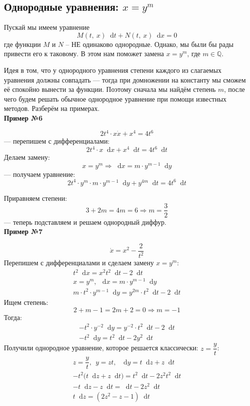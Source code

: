 \documentclass[a4paper,12pt]{article}
\newcommand{\Q}{\mathbb{Q}}
\renewcommand*\d{\mathop{}\!\mathrm{d}}
\newcommand{\dx}{\dot{x}}
\begin{document}
\subsection{Однородные уравнения: $x = y^m$}

Пускай мы имеем уравнение
\[M(t,\ x) \d t + N(t,\ x)\d x = 0\] где функции $M$ и $N$ -- НЕ одинаково однородные. Однако, мы были бы рады привести его к таковому. В этом нам поможет замена $x = y^m$, где $m \in \Q$. 

Идея в том, что у однородного уравнения степени каждого из слагаемых уравнения должны совпадать --- тогда при домножении на константу мы сможем её спокойно вынести за функции. Поэтому сначала мы найдём степень $m$, после чего будем решать обычное однородное уравнение при помощи известных методов. Разберём на примерах.
\ \\

\textbf{Пример №6}

\[2t^4\cdot x\dx + x^4 = 4t^6\] --- перепишем с дифференциалами:
\[2t^4 \cdot x\d x + x^4\d t= 4t^6\d t\]
Делаем замену:
\[x = y^m \Longrightarrow \d x = m \cdot y^{m - 1}\d y\] --- получаем уравнение:
\[2t^4 \cdot y^m \cdot m \cdot y^{m - 1}\d y + y^{4m}\d t = 4t^6\d t\]

Приравняем степени:
\[3 + 2m = 4m = 6 \Longrightarrow m = \dfrac{3}{2}\] --- теперь подставляем и решаем однородный диффур.
\ \\

\textbf{Пример №7}

\[\dx = x^2 - \dfrac{2}{t^2}\]
Перепишем с дифференциалами и сделаем замену $x = y^m$:
\begin{gather*}
	t^2\d x = x^2t^2\d t - 2\d t\\
	x = y^m,\ \d x =  m \cdot y^{m - 1}\d y\\
	m\cdot t^2 \cdot y^{m - 1}\d y = y^{2m}\cdot t^2\d t - 2\d t
\end{gather*}
Ищем степень:
\[2 + m - 1 = 2m + 2 = 0 \Longrightarrow m = -1\]
Тогда:
\begin{gather*}
	-t^2\cdot y^{-2}\d y = y^{-2} \cdot t^2\d t - 2\d t\\
	-t^2\d y = t^2\d t - 2y^2\d t
\end{gather*}
Получили однородное уравнение, которое решается классически: $z = \dfrac{y}{t}$:
\begin{gather*}
	z = \dfrac{y}{t},\ \ y = zt,\ \ \d y = t \d z + z\d t\\
	-t^2\big(t\d z + z\d t\big) = t^2\d t - 2z^2t^2\d t\\
	-t\d z - z \d t =  \d t - 2z^2\d t\\
	t\d z = (2z^2 - z - 1)\d t
\end{gather*}
\end{document}
